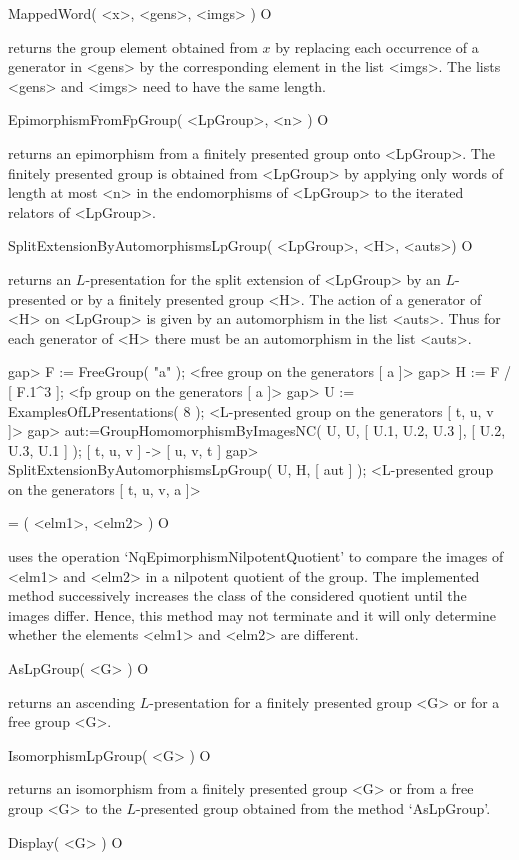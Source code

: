 \> MappedWord( <x>, <gens>, <imgs> ) O

returns the group element obtained from $x$ by replacing each occurrence
of a generator in <gens> by the corresponding element in the list
<imgs>. The lists <gens> and <imgs> need to have the same length.

\> EpimorphismFromFpGroup( <LpGroup>, <n> ) O

returns an epimorphism from a finitely presented group onto <LpGroup>. The
finitely presented group is obtained from <LpGroup> by applying only
words of length at most <n> in the endomorphisms of <LpGroup> to the
iterated relators of <LpGroup>.

\> SplitExtensionByAutomorphismsLpGroup( <LpGroup>, <H>, <auts>) O

returns an $L$-presentation for the split extension of <LpGroup> by
an $L$-presented or by a finitely presented group <H>. The action of a
generator of <H> on <LpGroup> is given by an automorphism in the list
<auts>. Thus for each generator of <H> there must be an automorphism in
the list <auts>.

\beginexample
gap> F := FreeGroup( "a" );
<free group on the generators [ a ]>
gap> H := F / [ F.1^3 ];
<fp group on the generators [ a ]>
gap> U := ExamplesOfLPresentations( 8 );
<L-presented group on the generators [ t, u, v ]>
gap> aut:=GroupHomomorphismByImagesNC( U, U, [ U.1, U.2, U.3 ], [ U.2, U.3, U.1 ] );
[ t, u, v ] -> [ u, v, t ]
gap> SplitExtensionByAutomorphismsLpGroup( U, H, [ aut ] );
<L-presented group on the generators [ t, u, v, a ]>
\endexample

\> = ( <elm1>, <elm2> ) O

uses the operation `NqEpimorphismNilpotentQuotient' to compare the images
of <elm1> and <elm2> in a nilpotent quotient of the group. The implemented
method successively increases the class of the considered quotient until
the images differ. Hence, this method may not terminate and it will only
determine whether the elements <elm1> and <elm2> are different.

\> AsLpGroup( <G> ) O

returns an ascending $L$-presentation for a finitely presented group <G>
or for a free group <G>.

\> IsomorphismLpGroup( <G> ) O

returns an isomorphism from a finitely presented group <G> or from a free
group <G> to the $L$-presented group obtained from the method `AsLpGroup'.

\> Display( <G> ) O 

